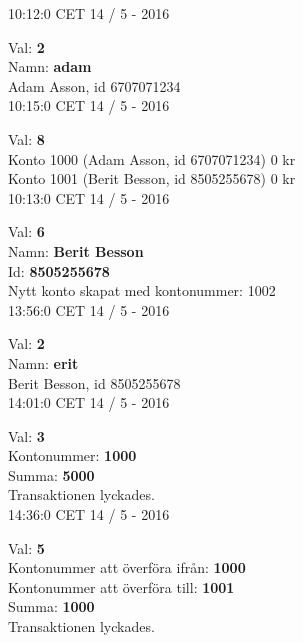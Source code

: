 \begin{multicols}{2}
\begin{exampleblock}
10:12:0 CET 14 / 5 - 2016\\
\end{exampleblock}
\begin{exampleblock}
Val: \textbf{2}\\
Namn: \textbf{adam}\\
Adam Asson, id 6707071234\\
10:15:0 CET 14 / 5 - 2016\\
\end{exampleblock}
\begin{exampleblock}
Val: \textbf{8}\\
Konto 1000 (Adam Asson, id 6707071234) 0 kr\\
Konto 1001 (Berit Besson, id 8505255678) 0 kr\\
10:13:0 CET 14 / 5 - 2016\\
\end{exampleblock}
\begin{exampleblock}
Val: \textbf{6}\\
Namn: \textbf{Berit Besson}\\
Id: \textbf{8505255678}\\
Nytt konto skapat med kontonummer: 1002\\
13:56:0 CET 14 / 5 - 2016\\
\end{exampleblock}
\begin{exampleblock}
Val: \textbf{2}\\
Namn: \textbf{erit}\\
Berit Besson, id 8505255678\\
14:01:0 CET 14 / 5 - 2016\\
\end{exampleblock}
\begin{exampleblock}
Val: \textbf{3}\\
Kontonummer: \textbf{1000}\\
Summa: \textbf{5000}\\
Transaktionen lyckades.\\
14:36:0 CET 14 / 5 - 2016\\
\end{exampleblock}
\begin{exampleblock}
Val: \textbf{5}\\
Kontonummer att överföra ifrån: \textbf{1000}\\
Kontonummer att överföra till: \textbf{1001}\\
Summa: \textbf{1000}\\
Transaktionen lyckades.\\

\end{exampleblock}
\end{multicols}
